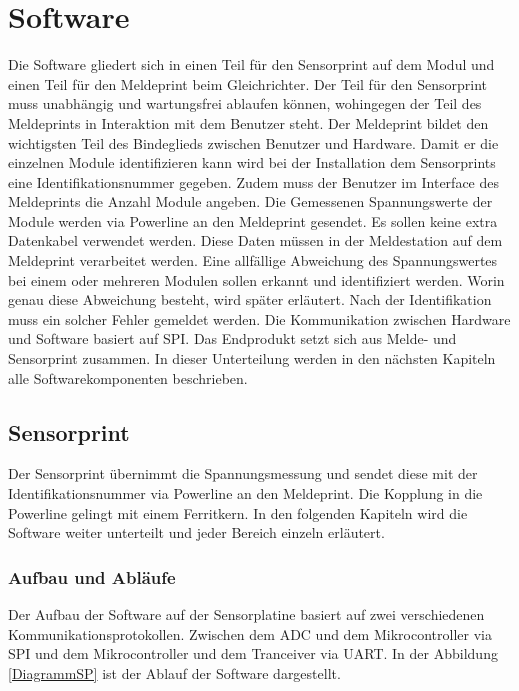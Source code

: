 
\section{Software}
Die Software gliedert sich in einen Teil für den Sensorprint auf dem Modul und einen Teil für den Meldeprint beim Gleichrichter. Der Teil für den Sensorprint muss unabhängig und wartungsfrei ablaufen können, wohingegen der Teil des Meldeprints in Interaktion mit dem Benutzer steht. Der Meldeprint bildet den wichtigsten Teil des Bindeglieds zwischen Benutzer und Hardware. Damit er die einzelnen Module identifizieren kann wird bei der Installation dem Sensorprints eine Identifikationsnummer gegeben. Zudem muss der Benutzer im Interface des Meldeprints die Anzahl Module angeben.
Die Gemessenen Spannungswerte der Module werden via Powerline an den Meldeprint gesendet. Es sollen keine extra Datenkabel verwendet werden. Diese Daten müssen in der Meldestation auf dem Meldeprint verarbeitet werden. Eine allfällige Abweichung des Spannungswertes bei einem oder mehreren Modulen sollen erkannt und identifiziert werden. Worin genau diese Abweichung besteht, wird später erläutert. Nach der Identifikation muss ein solcher Fehler gemeldet werden. Die Kommunikation zwischen Hardware und Software basiert auf SPI. Das Endprodukt setzt sich aus Melde- und Sensorprint zusammen. In dieser Unterteilung werden in den nächsten Kapiteln alle Softwarekomponenten beschrieben.
\newpage
\subsection{Sensorprint}\label{Software_sensorprint}
Der Sensorprint übernimmt die Spannungsmessung und sendet diese mit der Identifikationsnummer via Powerline an den Meldeprint. Die Kopplung in die Powerline gelingt mit einem Ferritkern. In den folgenden Kapiteln wird die Software weiter unterteilt und jeder Bereich einzeln erläutert.
\subsubsection{Aufbau und Abläufe}
Der Aufbau der Software auf der Sensorplatine basiert auf zwei verschiedenen Kommunikationsprotokollen. Zwischen dem ADC und dem Mikrocontroller via SPI und dem Mikrocontroller und dem Tranceiver via UART. In der Abbildung \ref{DiagrammSP} ist der Ablauf der Software dargestellt.

